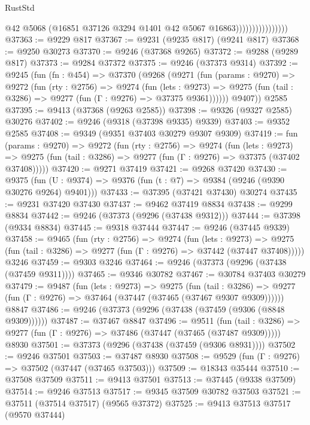 \begin{lexlean}{RustStd}
\begin{coremodule}
                                  @42
                                  @5068
                                  (@16851 @37126 @3294 @1401 @42 @5067 @16863))))))))))))))))
@37363 := @9229 @817
@37367 := @9231 (@9235 @817) (@9241 @817)
@37368 := @9250 @30273
@37370 := @9246 (@37368 @9265)
@37372 := @9288 (@9289 @817)
@37373 := @9284 @37372
@37375 := @9246 (@37373 @9314)
@37392 := @9245
    (fun (fn : @454) =>
    @37370
      (@9268
        (@9271
          (fun (params : @9270) =>
          @9272
            (fun (rty : @2756) =>
            @9274
              (fun (lets : @9273) =>
              @9275 (fun (tail : @3286) => @9277 (fun (Γ : @9276) => @37375 @9361))))))
        @9407))
    @2585
@37395 := @9413 (@37368 (@9263 @2585))
@37398 := @9326 (@9327 @2585) @30276
@37402 := @9246 (@9318 (@37398 @9335) @9339)
@37403 := @9352 @2585
@37408 := @9349 (@9351 @37403 @30279 @9307 @9309)
@37419 := fun (params : @9270) =>
  @9272
    (fun (rty : @2756) =>
    @9274
      (fun (lets : @9273) =>
      @9275 (fun (tail : @3286) => @9277 (fun (Γ : @9276) => @37375 (@37402 @37408)))))
@37420 := @9271 @37419
@37421 := @9268 @37420
@37430 := @9375
    (fun (U : @9374) => @9376 (fun (t : @7) => @9384 (@9246 (@9390 @30276 @9264) @9401)))
@37433 := @37395 (@37421 @37430) @30274
@37435 := @9231 @37420 @37430
@37437 := @9462 @37419 @8834
@37438 := @9299 @8834
@37442 := @9246 (@37373 (@9296 (@37438 @9312)))
@37444 := @37398 (@9334 @8834)
@37445 := @9318 @37444
@37447 := @9246 (@37445 @9339)
@37458 := @9465
    (fun (rty : @2756) =>
    @9274
      (fun (lets : @9273) =>
      @9275 (fun (tail : @3286) => @9277 (fun (Γ : @9276) => @37442 (@37447 @37408)))))
    @3246
@37459 := @9303 @3246
@37464 := @9246 (@37373 (@9296 (@37438 (@37459 @9311))))
@37465 := @9346 @30782
@37467 := @30784 @37403 @30279
@37479 := @9487
    (fun (lets : @9273) =>
    @9275
      (fun (tail : @3286) =>
      @9277 (fun (Γ : @9276) => @37464 (@37447 (@37465 (@37467 @9307 @9309))))))
    @8847
@37486 := @9246 (@37373 (@9296 (@37438 (@37459 (@9306 (@8848 @9309))))))
@37487 := @37467 @8847
@37496 := @9511
    (fun (tail : @3286) => @9277 (fun (Γ : @9276) => @37486 (@37447 (@37465 (@37487 @9309)))))
    @8930
@37501 := @37373 (@9296 (@37438 (@37459 (@9306 @8931))))
@37502 := @9246 @37501
@37503 := @37487 @8930
@37508 := @9529 (fun (Γ : @9276) => @37502 (@37447 (@37465 @37503)))
@37509 := @18343 @35444
@37510 := @37508 @37509
@37511 := @9413 @37501
@37513 := @37445 (@9338 @37509)
@37514 := @9246 @37513
@37517 := @9345 @37509 @30782 @37503
@37521 := @37511 (@37514 @37517) (@9565 @37372)
@37525 := @9413 @37513 @37517 (@9570 @37444)

\end{coremodule}
\end{lexlean}
